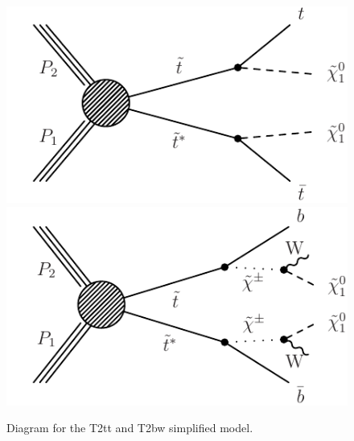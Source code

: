 \begin{figure}[hbt]
  \begin{center}
        \includegraphics[width=0.5\linewidth]{plots/stopPlot/T2tt.pdf}%
        \includegraphics[width=0.5\linewidth]{plots/stopPlot/T2bw.pdf}%
	\caption{Diagram for the T2tt and T2bw simplified model.}
	\label{fig:SigDiagram}
      \end{center}
\end{figure}


